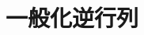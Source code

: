 \documentclass[../../topic_linear-algebra]{subfiles}
\begin{document}
\chapter{一般化逆行列}




\end{document}
